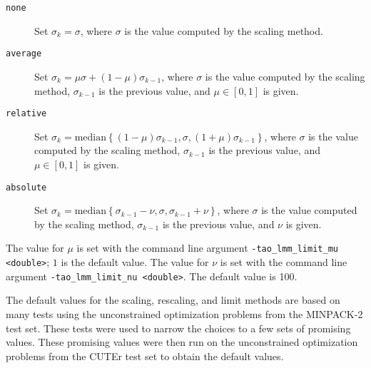 \begin{description}
\item[{\tt none}] Set $\sigma_k = \sigma$, where $\sigma$ is the value
computed by the scaling method.
\item[{\tt average}] Set $\sigma_k = \mu \sigma + (1 - \mu) \sigma_{k-1}$, 
where $\sigma$ is the value computed by the scaling method, $\sigma_{k-1}$ is
the previous value, and $\mu \in [0,1]$ is given.
\item[{\tt relative}] Set $\sigma_k = \mbox{median}\left\{ (1 - \mu) \sigma_{k-1}, \sigma, (1+\mu) \sigma_{k-1}\right\}$, 
where $\sigma$ is the value computed by the scaling method, $\sigma_{k-1}$ is 
the previous value, and $\mu \in [0,1]$ is given.
\item[{\tt absolute}] Set $\sigma_k = \mbox{median}\left\{\sigma_{k-1} - \nu, \sigma, \sigma_{k-1} + \nu\right\}$, 
where $\sigma$ is the value computed by the scaling method, $\sigma_{k-1}$ is 
the previous value, and $\nu$ is given.
\end{description}
The value for $\mu$ is set with the command line argument 
{\tt -tao\_lmm\_limit\_mu <double>}; $1$ is the default value.
The value for $\nu$ is set with the command line argument 
{\tt -tao\_lmm\_limit\_nu <double>}.  The default value is 100.  

The default values for the scaling, rescaling, and limit methods are based 
on many tests using the unconstrained optimization problems from the 
MINPACK-2 test set.  These tests were used to narrow the choices to 
a few sets of promising values.  These promising values were then 
run on the unconstrained optimization problems from the CUTEr 
test set to obtain the default values.

